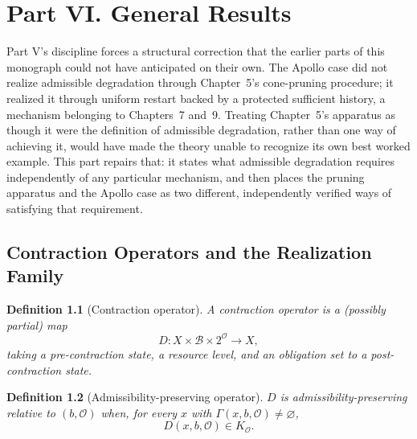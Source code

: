 \documentclass[11pt]{report}
\newtheorem{definition}{Definition}[chapter]
\begin{document}
\part*{Part VI. General Results}

Part V's discipline forces a structural correction that the earlier parts of this monograph could not have anticipated on their own. The Apollo case did not realize admissible degradation through Chapter~5's cone-pruning procedure; it realized it through uniform restart backed by a protected sufficient history, a mechanism belonging to Chapters~7 and~9. Treating Chapter~5's apparatus as though it were the definition of admissible degradation, rather than one way of achieving it, would have made the theory unable to recognize its own best worked example. This part repairs that: it states what admissible degradation requires independently of any particular mechanism, and then places the pruning apparatus and the Apollo case as two different, independently verified ways of satisfying that requirement.

\chapter{Contraction Operators and the Realization Family}

\begin{definition}[Contraction operator]
A contraction operator is a (possibly partial) map
\[
D : X \times \mathcal B \times 2^{\mathcal O} \longrightarrow X,
\]
taking a pre-contraction state, a resource level, and an obligation set to a post-contraction state.
\end{definition}

\begin{definition}[Admissibility-preserving operator]
$D$ is admissibility-preserving relative to $(b, \mathcal O)$ when, for every $x$ with $\Gamma(x, b, \mathcal O) \ne \varnothing$,
\[
D(x, b, \mathcal O) \in K_{\mathcal O}.
\]
\end{definition}
\end{document}
